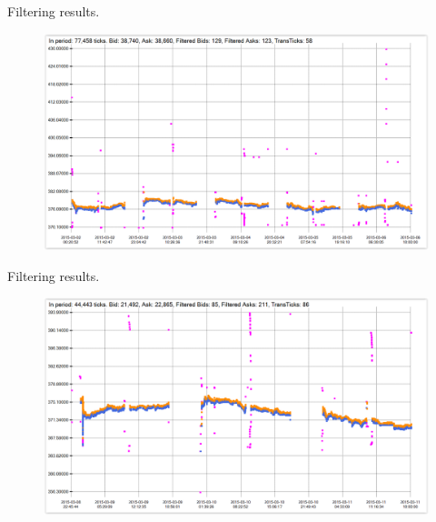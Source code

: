 \documentclass{beamer}
\begin{document}
\begin{frame}{Filtering results.}

\begin{figure}
    \centering
    \includegraphics[width=1\textwidth]{../wykresy/sggood.PNG}
\end{figure}

\end{frame}


\begin{frame}{Filtering results.}

\begin{figure}
    \centering
    \includegraphics[width=1\textwidth]{../wykresy/sgbadgood.PNG}
\end{figure}

\end{frame}
\end{document}
